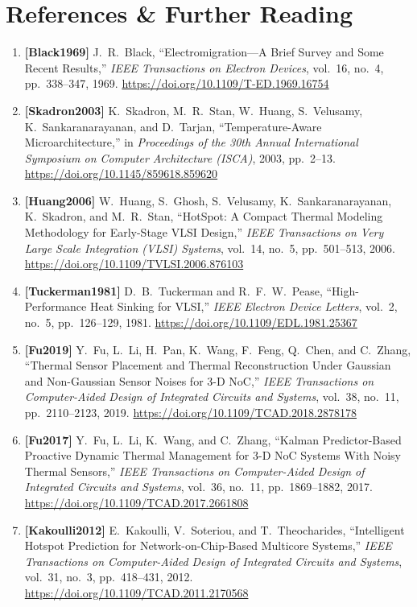 \section{References \& Further Reading}
\label{sec:ch7_references}

\begin{enumerate}
    \item \textbf{[Black1969]} J.~R.~Black, ``Electromigration---A Brief Survey and Some Recent Results,'' \emph{IEEE Transactions on Electron Devices}, vol.~16, no.~4, pp.~338--347, 1969. \url{https://doi.org/10.1109/T-ED.1969.16754}
    \item \textbf{[Skadron2003]} K.~Skadron, M.~R.~Stan, W.~Huang, S.~Velusamy, K.~Sankaranarayanan, and D.~Tarjan, ``Temperature-Aware Microarchitecture,'' in \emph{Proceedings of the 30th Annual International Symposium on Computer Architecture (ISCA)}, 2003, pp.~2--13. \url{https://doi.org/10.1145/859618.859620}
    \item \textbf{[Huang2006]} W.~Huang, S.~Ghosh, S.~Velusamy, K.~Sankaranarayanan, K.~Skadron, and M.~R.~Stan, ``HotSpot: A Compact Thermal Modeling Methodology for Early-Stage VLSI Design,'' \emph{IEEE Transactions on Very Large Scale Integration (VLSI) Systems}, vol.~14, no.~5, pp.~501--513, 2006. \url{https://doi.org/10.1109/TVLSI.2006.876103}
    \item \textbf{[Tuckerman1981]} D.~B.~Tuckerman and R.~F.~W.~Pease, ``High-Performance Heat Sinking for VLSI,'' \emph{IEEE Electron Device Letters}, vol.~2, no.~5, pp.~126--129, 1981. \url{https://doi.org/10.1109/EDL.1981.25367}
    \item \textbf{[Fu2019]} Y.~Fu, L.~Li, H.~Pan, K.~Wang, F.~Feng, Q.~Chen, and C.~Zhang, ``Thermal Sensor Placement and Thermal Reconstruction Under Gaussian and Non-Gaussian Sensor Noises for 3-D NoC,'' \emph{IEEE Transactions on Computer-Aided Design of Integrated Circuits and Systems}, vol.~38, no.~11, pp.~2110--2123, 2019. \url{https://doi.org/10.1109/TCAD.2018.2878178}
    \item \textbf{[Fu2017]} Y.~Fu, L.~Li, K.~Wang, and C.~Zhang, ``Kalman Predictor-Based Proactive Dynamic Thermal Management for 3-D NoC Systems With Noisy Thermal Sensors,'' \emph{IEEE Transactions on Computer-Aided Design of Integrated Circuits and Systems}, vol.~36, no.~11, pp.~1869--1882, 2017. \url{https://doi.org/10.1109/TCAD.2017.2661808}
    \item \textbf{[Kakoulli2012]} E.~Kakoulli, V.~Soteriou, and T.~Theocharides, ``Intelligent Hotspot Prediction for Network-on-Chip-Based Multicore Systems,'' \emph{IEEE Transactions on Computer-Aided Design of Integrated Circuits and Systems}, vol.~31, no.~3, pp.~418--431, 2012. \url{https://doi.org/10.1109/TCAD.2011.2170568}

\end{enumerate}
